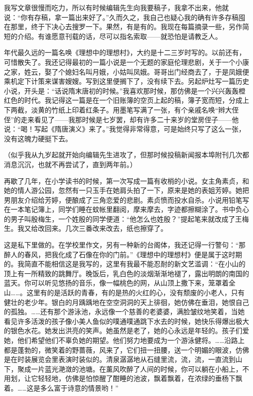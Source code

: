\par 我写文章很慢而吃力，所以有时候编辑先生向我要稿子，我拿不出来，他就说：“你有存稿，拿一篇出来好了。”久而久之，我自己也疑心我的确有许多存稿囤在那里，终于下决心去搜罗一下。果然，有是有的。我现在每篇摘录一些，另作简短的介绍。有谁愿意刊载的话，尽可以指名索取——就恐怕是请教乏人。
\par 年代最久远的一篇名唤《理想中的理想村》，大约是十二三岁时写的。以前还有，可惜散失了。我还记得最初的一篇小说是一个无题的家庭伦理悲剧，关于一个小康之家，姓云，娶了个媳妇名叫月娥，小姑叫凤娥。哥哥出门经商去了，于是凤娥便乘机定下计策来谋害嫂嫂。写到这里便搁下了，没有续下去。另起炉灶写一篇历史小说，开头是：“话说隋末唐初的时候。”我喜欢那时候，那仿佛是一个兴兴轰轰橙红色的时代。我记得这一篇是在一个旧账簿的空页上起的稿，簿子宽而短，分成上下两截，淡黄的竹纸上印着红条子。用墨笔写满了一张，有个亲戚名唤“辫大侄侄”的走来看见了——我那时候是七岁罢，却有许多二十来岁的堂房侄子——他说：“喝！写起《隋唐演义》来了。”我觉得非常得意，可是始终只写了这么一张，没有这魄力硬挺下去。
\par （似乎我从九岁起就开始向编辑先生进攻了，但那时候投稿新闻报本埠附刊几次都消息沉沉，也就不再尝试了，直到两年前。）
\par 再歇了几年，在小学读书的时候，第一次写成一篇有收梢的小说。女主角素贞，和她的情人游公园，忽然有一只玉手在她肩头拍了一下，原来是她的表姐芳婷。她把男朋友介绍给芳婷，便酿成了三角恋爱的悲剧。素贞愤而投水自杀。小说用铅笔写在一本笔记簿上，同学们睡在蚊帐里翻阅，摩来摩去，字迹都擦糊涂了。书中负心的男子叫殷梅生，一个姓殷的同学便道：“他怎么也姓殷？”提起笔来就改成了王梅生。我又给改回来。几次三番改来改去，纸也擦穿了。
\par 这是私下里做的。在学校里作文，另有一种新的台阁体，我还记得一行警句：“那醉人的春风，把我化成了石像在你的门前。”《理想中的理想村》便是属于这时期的。我简直不能相信这是我写的，这里有我最不能忍耐的新文艺滥调：“在小山的顶上有一所精致的跳舞厅。晚饭后，乳白色的淡烟渐渐地褪了，露出明朗的南国的蓝天。你可以听见悠扬的音乐，像一幅桃色的网，从山顶上撒下来，笼罩着全山……。这里有的是活跃的青春，有的是热的火红的心，没有颓废的小老人，只有健壮的老少年。银白的月踽踽地在空空洞洞的天上徘徊，她仿佛在垂泪，她恨自己的孤独。……还有那个游泳池，永远像一个慈善的老婆婆，满脸皱纹地笑着，当她看见许多活泼的孩子像小美人鱼似的噗通噗通跳下水去的时候，她快乐得爆出极大的银色水花。她发出洪亮的笑声。她虽然是老了，她的心永远是年轻的。孩子们爱她，他们希望他们不辜负她的期望。他们努力地要成为一个游泳健将。……沿路上都是蓬勃的，微笑着的野蔷薇，风来了，它们扭一扭腰，送一个明媚的眼波，仿佛是在时装展览会里表演时装似的。清泉潺潺地从石缝里流，流，流，一直流到山下，聚成一片蓝光滟潋的池塘。在薰风吹醉了人间的时候，你可以躺在小船上，不用划，让它轻轻地，仿佛是怕惊醒了酣睡的池波，飘着飘着，在浓绿的垂杨下飘着。……这是多么富于诗意的情景哟！”
